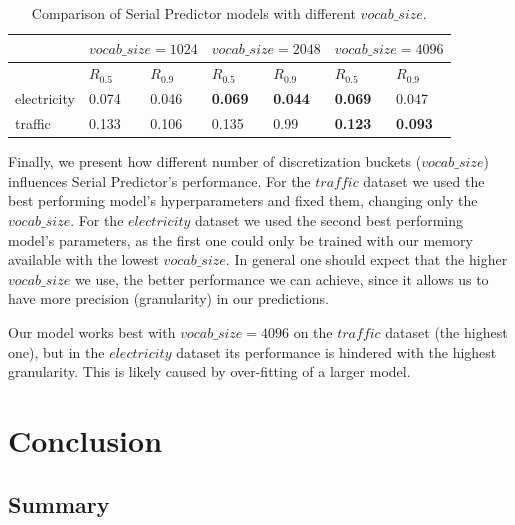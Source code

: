 \documentclass[en]{pracamgr}
\begin{document}
\begin{table}[h]
	\begin{center}
		\begin{tabular}
			{ |p{2cm}|p{1.5cm}|p{1.5cm}||p{1.5cm}|p{1.5cm}||p{1.5cm}|p{1.5cm}|   }
			\hline
			& \multicolumn{2}{c||}{$vocab\_size=1024$} & \multicolumn{2}{|c|}{$vocab\_size=2048$} & \multicolumn{2}{|c|}{$vocab\_size=4096$} \\
			\hline
			& \hfil $R_{0.5}$ & \hfil $R_{0.9}$ & \hfil $R_{0.5}$ & \hfil $R_{0.9} $ & \hfil $R_{0.5}$ & \hfil $R_{0.9} $
			\\
			\hline
			electricity & \hfil 0.074   & \hfil 0.046    & \hfil \textbf{0.069} &   \hfil \textbf{0.044} & \hfil \textbf{0.069} &   \hfil 0.047 \\
			
			traffic &  \hfil 0.133 &   \hfil 0.106 & 0.135 &   \hfil 0.99 & \textbf{\hfil 0.123} &   \hfil \textbf{0.093} \\
			\hline
		\end{tabular}
		\caption{\label{tab:results}Comparison of Serial Predictor models with different $vocab\_size$.}
	\end{center}
\end{table}

Finally, we present how different number of discretization buckets ($vocab\_size$) influences Serial Predictor's performance. For the $traffic$ dataset we used the best performing model's hyperparameters and fixed them, changing only the $vocab\_size$. For the $electricity$ dataset we used the second best performing model's parameters, as the first one could only be trained with our memory available with the lowest $vocab\_size$. In general one should expect that the higher $vocab\_size$ we use, the better performance we can achieve, since it allows us to have more precision (granularity) in our predictions.


Our model works best with $vocab\_size = 4096$ on the $traffic$ dataset (the highest one), but in the $electricity$ dataset its performance is hindered with the highest granularity. This is likely caused by over-fitting of a larger model.




\chapter{Conclusion}

\section{Summary}
\end{document}
